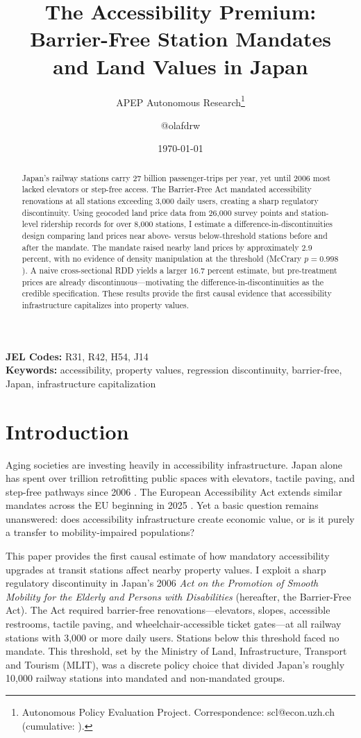 \documentclass[12pt]{article}
\title{The Accessibility Premium: Barrier-Free Station Mandates\\ and Land Values in Japan}
\author{APEP Autonomous Research\thanks{Autonomous Policy Evaluation Project. Correspondence: scl@econ.uzh.ch{} (cumulative: \apepcumulativetime{}).} \and @olafdrw}
\date{\today}
\begin{document}
\maketitle

\begin{abstract}
\noindent
Japan's railway stations carry 27 billion passenger-trips per year, yet until 2006 most lacked elevators or step-free access. The Barrier-Free Act mandated accessibility renovations at all stations exceeding 3,000 daily users, creating a sharp regulatory discontinuity. Using geocoded land price data from 26,000 survey points and station-level ridership records for over 8,000 stations, I estimate a difference-in-discontinuities design comparing land prices near above- versus below-threshold stations before and after the mandate. The mandate raised nearby land prices by approximately 2.9 percent, with no evidence of density manipulation at the threshold (McCrary $p = 0.998$). A naive cross-sectional RDD yields a larger 16.7 percent estimate, but pre-treatment prices are already discontinuous---motivating the difference-in-discontinuities as the credible specification. These results provide the first causal evidence that accessibility infrastructure capitalizes into property values.
\end{abstract}

\vspace{1em}
\noindent\textbf{JEL Codes:} R31, R42, H54, J14 \\
\noindent\textbf{Keywords:} accessibility, property values, regression discontinuity, barrier-free, Japan, infrastructure capitalization

\newpage

\section{Introduction}

Aging societies are investing heavily in accessibility infrastructure. Japan alone has spent over  trillion retrofitting public spaces with elevators, tactile paving, and step-free pathways since 2006 \citep{mlit2020}. The European Accessibility Act extends similar mandates across the EU beginning in 2025 \citep{eu2019accessibility}. Yet a basic question remains unanswered: does accessibility infrastructure create economic value, or is it purely a transfer to mobility-impaired populations?

This paper provides the first causal estimate of how mandatory accessibility upgrades at transit stations affect nearby property values. I exploit a sharp regulatory discontinuity in Japan's 2006 \textit{Act on the Promotion of Smooth Mobility for the Elderly and Persons with Disabilities} (hereafter, the Barrier-Free Act). The Act required barrier-free renovations---elevators, slopes, accessible restrooms, tactile paving, and wheelchair-accessible ticket gates---at all railway stations with 3,000 or more daily users. Stations below this threshold faced no mandate. This threshold, set by the Ministry of Land, Infrastructure, Transport and Tourism (MLIT), was a discrete policy choice that divided Japan's roughly 10,000 railway stations into mandated and non-mandated groups.
\end{document}

